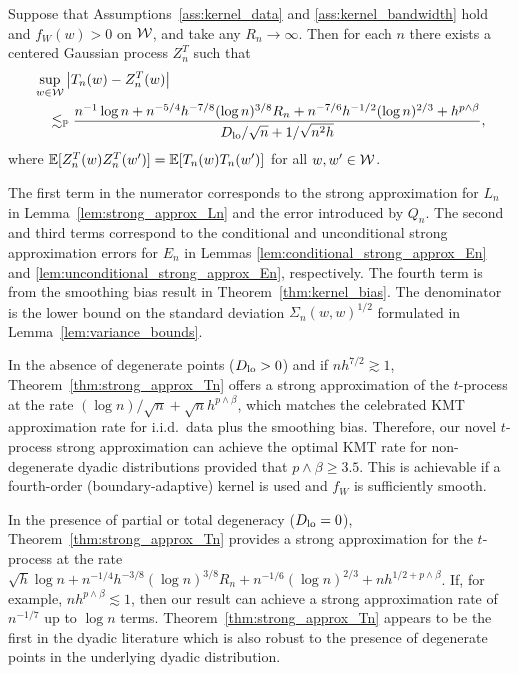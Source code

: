\begin{theorem}
  \label{thm:strong_approx_Tn}

  Suppose that Assumptions~\ref{ass:kernel_data} and \ref{ass:kernel_bandwidth}
  hold and $f_W(w) > 0$ on $\mathcal{W}$, and take any $R_n \to \infty$. Then for each
  $n$ there exists a centered Gaussian process $Z_n^{T}$ such that
  \begin{align*}
    &\sup_{w \in \mathcal{W}} \left| T_n(w) - Z_n^{T}(w) \right| \\
    &\quad\lesssim_{\mathbb{P}}
    \frac{
      n^{-1} \log n
      + n^{-5/4} h^{-7/8} (\log n)^{3/8} R_n
      + n^{-7/6} h^{-1/2} (\log n)^{2/3}
    + h^{p\wedge\beta}}
    {D_{\textup{lo}}/\sqrt{n} + 1/\sqrt{n^2h}},
  \end{align*}
  where $\mathbb{E}[Z_n^T(w)Z_n^T(w')] = \mathbb{E}[T_n(w)T_n(w')]$ for all $w,w' \in \mathcal{W}$.
\end{theorem}

The first term in the numerator corresponds to the strong approximation for
$L_n$ in Lemma~\ref{lem:strong_approx_Ln} and the error introduced by $Q_n$.
The second and third terms correspond to the conditional and unconditional
strong approximation errors for $E_n$ in Lemmas
\ref{lem:conditional_strong_approx_En} and
\ref{lem:unconditional_strong_approx_En}, respectively. The fourth term is from
the smoothing bias result in Theorem~\ref{thm:kernel_bias}. The denominator is
the lower bound on the standard deviation $\Sigma_n(w,w)^{1/2}$ formulated in
Lemma~\ref{lem:variance_bounds}.

In the absence of degenerate points ($D_{\textup{lo}} > 0$) and if $n h^{7/2}\gtrsim 1$,
Theorem~\ref{thm:strong_approx_Tn} offers a strong approximation of the
$t$-process at the rate $(\log n)/\sqrt{n}+\sqrt{n}h^{p\wedge\beta}$, which
matches the celebrated KMT approximation rate for i.i.d.\ data plus the
smoothing bias. Therefore, our novel $t$-process strong approximation can
achieve the optimal KMT rate for non-degenerate dyadic distributions provided
that $p\wedge\beta \geq 3.5$. This is achievable if a fourth-order
(boundary-adaptive) kernel is used and $f_W$ is sufficiently smooth.

In the presence of partial or total degeneracy ($D_{\textup{lo}} =0$),
Theorem~\ref{thm:strong_approx_Tn} provides a strong approximation for the
$t$-process at the rate
$\sqrt{h}\log n + n^{-1/4}h^{-3/8}(\log n)^{3/8} R_n + n^{-1/6}(\log n)^{2/3}
+ n h^{1/2+p\wedge\beta}$. If, for example, $n h^{p\wedge\beta}\lesssim 1$,
then our result can achieve a strong approximation rate of $n^{-1/7}$ up to
$\log n $ terms. Theorem~\ref{thm:strong_approx_Tn} appears to be the first in
the dyadic literature which is also robust to the presence of
degenerate points in the underlying dyadic distribution.

